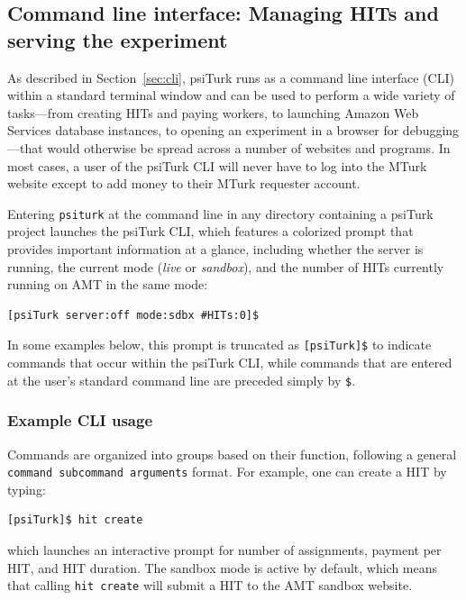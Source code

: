 \documentclass[twocolumn]{svjour3}          %
\newcommand{\psiturk}[0]{\textsf{psiTurk}}
\begin{document}
\subsection{Command line interface: Managing HITs and serving the experiment}

As described in Section~\ref{sec:cli}, \psiturk{} runs as a command line interface
(CLI) within a standard terminal window and can be used to perform a wide
variety of tasks---from creating HITs and paying workers, to launching Amazon
Web Services database instances, to opening an experiment in a browser for
debugging---that would otherwise be spread across a number of websites and
programs. In most cases, a user of the \psiturk{} CLI will never have to log into
the MTurk website except to add money to their MTurk requester account.

Entering
\texttt{psiturk} at the command line in any directory containing a \psiturk{} project launches the
\psiturk{} CLI, whieh features a colorized prompt that provides important information at a glance, including
whether the server is running, the current mode (\emph{live} or \emph{sandbox}), and the number of HITs currently running on AMT in the same mode:

\begin{lstlisting}
[psiTurk server:off mode:sdbx #HITs:0]$
\end{lstlisting}

\noindent In some examples below, this prompt is truncated as \texttt{[psiTurk]\$} to indicate commands that occur within the \psiturk{} CLI, while commands that are entered at the user's standard command line are preceded simply by \texttt{\$}.

\subsubsection{Example CLI usage}
Commands are organized into groups based on their function, following a general \texttt{command subcommand
arguments} format. For example, one can create a HIT by typing: 

\begin{lstlisting}
[psiTurk]$ hit create
\end{lstlisting}

\noindent which launches an interactive prompt for number of assignments, payment per HIT, and HIT duration. The sandbox mode is active by default, which means that calling \texttt{hit create} will submit a HIT to the AMT sandbox website.
\end{document}
